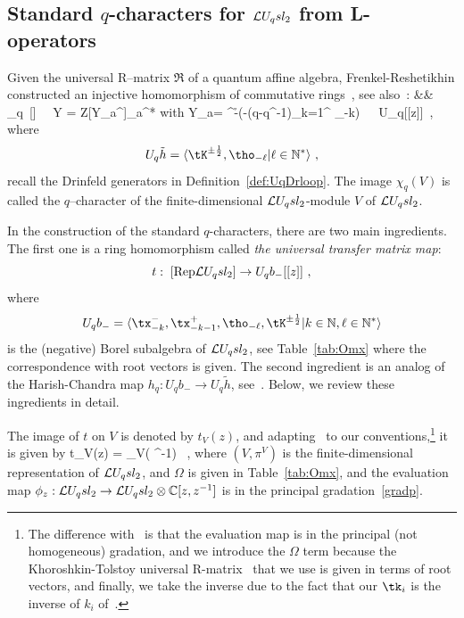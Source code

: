 \documentclass[11pt]{amsart}
\numberwithin{equation}{section}
\numberwithin{equation}{section}
\begin{document}
\subsection{Standard $q$-characters for $\mathcal{L} U_q sl_2$ from L-operators}  Given the universal R–matrix $\mathfrak{R}$ of a quantum affine algebra, Frenkel-Reshetikhin constructed an injective homomorphism of commutative rings~\cite{FR99}, see also~\cite[Thm.\,2.2\,\&\,eq.\,(2.3)]{FMu99}:
		\beqa
		&& \chi_q\colon \ [\Loop] \ \rightarrow \ {\cal Y} = {\mathbb Z}[Y_{a}^{}]_{a^*} \label{eq:char}
		\eeqa
		 with 
		 \beqa
		  Y_a= \tK^{-\h}\exp\Big(-(q-q^{-1})\sum_{k=1}^{\infty} \tho_{-k}\Big)\ \ \in \  U_q[[z]]\ ,\label{eq:chiY}
		\eeqa
		 where 
         \begin{equation}\label{eq:Uqth-def}
         U_q\tilde{h}= \langle \tK^{\pm \h},\tho_{-\ell}|\ell\in{\mathbb N}^*\rangle \ ,
         \end{equation}
         recall the Drinfeld generators in Definition~\ref{def:UqDrloop}.  The  image  $\chi_q(V)$ is called the $q$–character of the finite-dimensional $\mathcal{L} U_q sl_2$-module $V$ of $\mathcal{L} U_q sl_2$.  
         
         In the construction of the standard $q$-characters, there are two main ingredients. The first one is a ring  homomorphism called \textit{the universal transfer matrix map}:
    \begin{equation}\label{eq:t-defR}
         t : \; [\mathrm{Rep}\mathcal{L} U_q sl_2] \to U_qb_-[[z]]\ ,
         \end{equation}
          where 
          $$
          U_qb_-=\langle \tx_{-k}^-,\tx_{-k-1}^+,\tho_{-\ell},\tK^{\pm \h}|k\in{\mathbb N},\ell\in{\mathbb N}^*\rangle 
          $$
          is the (negative) Borel subalgebra of $\mathcal{L} U_q sl_2$, 
         see Table~\ref{tab:Omx} where the correspondence with root vectors is given. The second ingredient is an analog of the Harish-Chandra  map
$h_q: U_qb_- \to U_q \tilde{h}$, see~\cite[Def.\,2]{FR99}. Below, we review these ingredients in detail.

         
         The image of $t$ on $V$ is denoted by $t_V(z)$, and adapting~\cite[Eq.\,(2.1)]{FMu99} to our conventions,\footnote{The difference with~\cite{FMu99} is that the evaluation map  is in the principal (not homogeneous) gradation, and we introduce the $\Omega$ term because  the Khoroshkin-Tolstoy universal R-matrix~\cite[Eq.\,(4.23)]{Boos2012} that we use is given in terms of root vectors, and finally, we take the inverse due to the fact that our $\tk_i$ is the inverse of $k_i$ of~\cite{FR99}.} it is given by
         \beqa\label{eq:tV-def}
         t_V(z) =  _V\Big( ^{-1}\Big)
         \ ,
         \eeqa
         where $(V,\pi^V)$ is the finite-dimensional representation of $\mathcal{L} U_q sl_2$, and $\Omega$ is given in Table~\ref{tab:Omx}, and the evaluation map $\phi_z:\mathcal{L} U_q sl_2\rightarrow \mathcal{L} U_q sl_2 \otimes {\mathbb C}[z,z^{-1}]$ is in the principal gradation~\eqref{gradp}. 
         
\end{document}
